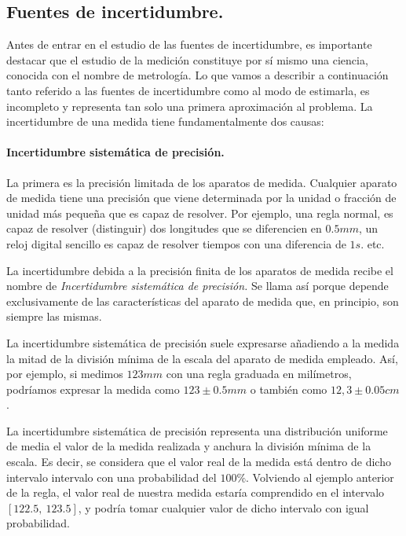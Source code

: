 \begin{paracol}{2}
\subsection{Fuentes de incertidumbre.}\label{fdi}

Antes de entrar en el estudio de las fuentes de incertidumbre, es importante destacar que el estudio de la medición constituye por sí mismo una ciencia, conocida con el nombre de metrología. Lo que vamos a describir a continuación tanto referido a las fuentes de incertidumbre como al modo de estimarla, es incompleto y representa tan solo una primera aproximación al problema.
La incertidumbre de una medida tiene fundamentalmente dos causas:

\paragraph{Incertidumbre sistemática de precisión.}
 La primera es la precisión limitada de los aparatos de medida. Cualquier aparato de medida tiene una precisión que viene determinada por la unidad o fracción de unidad más pequeña que es capaz de resolver. Por ejemplo, una regla normal, es capaz de resolver (distinguir) dos longitudes que se diferencien en $0.5 mm$, un reloj digital sencillo es capaz de resolver tiempos con una diferencia de $1s.$ etc.
 
La incertidumbre debida a la precisión finita de los aparatos de medida recibe el nombre de \emph{Incertidumbre sistemática de precisión.} 
Se llama así porque depende exclusivamente de las características del aparato de medida que, en principio, son siempre las mismas.

La incertidumbre sistemática de precisión suele expresarse añadiendo a la medida la mitad de la división mínima de la escala del aparato de medida empleado. Así, por ejemplo, si medimos $123 mm$ con una regla graduada en milímetros, podríamos expresar la  medida como $123 \pm 0.5 mm$ o también como $12,3\pm0.05cm$.


La incertidumbre sistemática de precisión representa una distribución uniforme de media el valor de la medida realizada y anchura la división mínima de la escala. Es decir, se considera que el valor real de la medida está dentro de dicho intervalo intervalo con una probabilidad del $100\%$. Volviendo al ejemplo anterior de la regla, el valor real de nuestra medida estaría comprendido en el intervalo $[122.5,\ 123.5 ]$, y podría tomar cualquier valor de dicho intervalo con igual probabilidad. 


\end{paracol}
